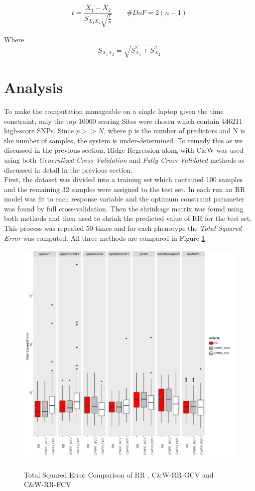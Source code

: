 \documentclass[a4paper]{article}
\begin{document}
\begin{equation}
t = \frac{\bar{X}_1 - \bar{X}_2}{{S}_{X_1X_2}\sqrt{\frac{1}{n}}} \qquad \#DoF = 2(n-1) 
\end{equation}

Where $$S_{X_1X_2} = \sqrt{S_{X_1}^2 + S_{X_2}^2}$$




\section{Analysis}
To make the computation manageable on a single laptop given the time constraint, only the top 10000 scoring Sites were chosen which contain 446211 high-score SNPs. Since $p >>N$, where p is the number of predictors and N is the number of samples, the system is under-determined. To remedy this as we discussed in the previous section, Ridge Regression along with C\&W was used using both \textit{Generalized Cross-Validation} and \textit{Fully Cross-Validated} methods as discussed in detail in the previous section.\\
First, the dataset was divided into a training set which contained 100 samples and the remaining 32 samples were assigned to the test set. In each run an RR model was fit to each response variable and the optimum constraint parameter was found by full cross-validation. Then the shrinkage matrix was found using both methods and then used to shrink the predicted value of RR for the test set. This process was repeated 50 times and for each phenotype the \textit{Total Squared Error} was computed. All three methods are compared in Figure \ref{fig:boxplotMethods}.

\begin{figure}
\centering
\includegraphics[width = 1\textwidth]{boxplotMethods.pdf}
\label{fig:boxplotMethods}
\caption{Total Squared Error Comparison of RR , C\&W-RR-GCV and C\&W-RR-FCV}
\end{figure}
\end{document}
